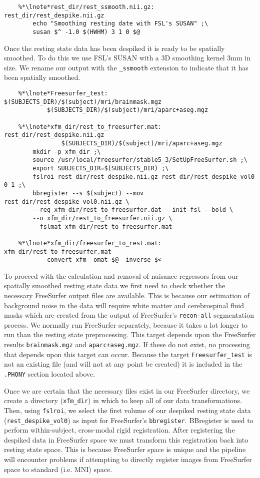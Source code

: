\begin{lstlisting}
	%*\lnote*rest_dir/rest_ssmooth.nii.gz: rest_dir/rest_despike.nii.gz
		echo "Smoothing resting date with FSL's SUSAN" ;\
		susan $^ -1.0 $(HWHM) 3 1 0 $@
\end{lstlisting}

 Once the resting state data has been despiked it is ready to be spatially smoothed. To do this we use FSL's SUSAN with a 3D smoothing kernel 3mm in size. We rename our output with the  \texttt{_ssmooth} extension to indicate that it has been spatially smoothed.

\begin{lstlisting}
	%*\lnote*Freesurfer_test: $(SUBJECTS_DIR)/$(subject)/mri/brainmask.mgz 
			$(SUBJECTS_DIR)/$(subject)/mri/aparc+aseg.mgz

	%*\lnote*xfm_dir/rest_to_freesurfer.mat: rest_dir/rest_despike.nii.gz 
				$(SUBJECTS_DIR)/$(subject)/mri/aparc+aseg.mgz
		mkdir -p xfm_dir ;\
		source /usr/local/freesurfer/stable5_3/SetUpFreeSurfer.sh ;\
		export SUBJECTS_DIR=$(SUBJECTS_DIR) ;\
		fslroi rest_dir/rest_despike.nii.gz rest_dir/rest_despike_vol0 0 1 ;\
		bbregister --s $(subject) --mov rest_dir/rest_despike_vol0.nii.gz \
		--reg xfm_dir/rest_to_freesurfer.dat --init-fsl --bold \
		--o xfm_dir/rest_to_freesurfer.nii.gz \
		--fslmat xfm_dir/rest_to_freesurfer.mat

	%*\lnote*xfm_dir/freesurfer_to_rest.mat: xfm_dir/rest_to_freesurfer.mat
			convert_xfm -omat $@ -inverse $<
\end{lstlisting}

\lnum{11} To proceed with the calculation and removal of nuisance regressors from our spatially smoothed resting state data we first need to check whether the necessary FreeSurfer output files are available. This is because our estimation of background noise in the data will require white matter and cerebrospinal fluid masks which are created from the output of FreeSurfer's \texttt{recon-all} segmentation process. We normally run FreeSurfer separately, because it takes a lot longer to run than the resting state preprocessing. This target depends upon the FreeSurfer results \texttt{brainmask.mgz} and \texttt{aparc+aseg.mgz}. If these do not exist, no processing that depends upon this target can occur. Because the target \texttt{Freesurfer_test} is not an existing file (and will not at any point be created) it is included in the \texttt{.PHONY} section located above.

\lnum{12} Once we are certain that the necessary files exist in our FreeSurfer directory, we create a directory (\texttt{xfm_dir}) in which to keep all of our data transformations. Then, using \texttt{fslroi}, we select the first volume of our despiked resting state data (\texttt{rest_despike_vol0}) as input for FreeSurfer's \texttt{bbregister}. BBregister is used to perform within-subject, cross-modal rigid registration.  After registering the despiked data in FreeSurfer space we must transform this registration back into resting state space. This is because FreeSurfer space is unique and the pipeline will encounter problems if attempting to directly register images from FreeSurfer space to standard (i.e. MNI) space.

